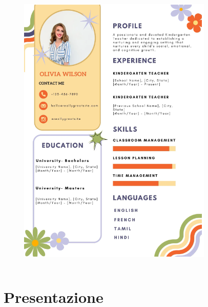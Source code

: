\documentclass[handout]{beamer}
\begin{document}
\begin{frame}
\begin{columns}
\begin{column}{.45\textwidth}
\begin{figure}
      \includegraphics[width=\columnwidth]{img/cv8.png}
    \end{figure}
  \end{column}
\end{columns}
\end{frame}



\section{Presentazione}
\end{document}
